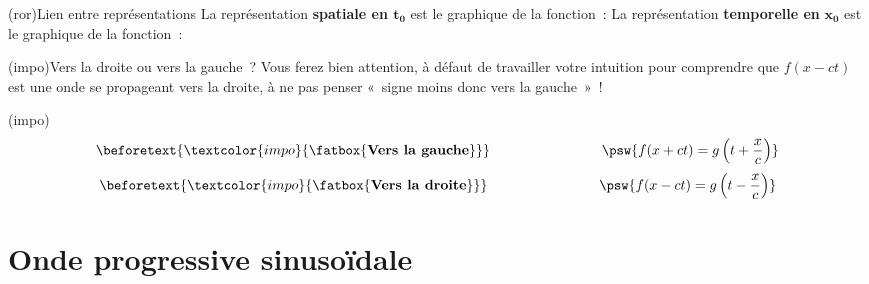 \documentclass[../../main/main.tex]{subfiles}
\begin{document}

\begin{tcb}[sidebyside](ror){Lien entre représentations}
	La représentation \textbf{spatiale en $\mathbf{t_0}$} est le graphique de la
	fonction~:
	\psw{%
		\[y~:~x \mapsto y(x,t_0) = f(x-ct_0) = g\left(t_0 - \frac{x}{c}\right)\]
	}%
	\vspace{-15pt}
	\tcblower
	La représentation \textbf{temporelle en} $\mathbf{x_0}$ est le graphique de la
	fonction~:
	\psw{%
		\[y~:~t \mapsto y(x_0,t) = f(x_0-ct) = g\left(t - \frac{x_0}{c}\right)\]
	}%
	\vspace{-15pt}
\end{tcb}

\begin{tcb*}(impo){Vers la droite ou vers la gauche~?}
	Vous ferez bien attention, à défaut de travailler votre intuition pour
	comprendre que $f (x-ct)$ est une onde se propageant vers la droite, à ne pas
	penser «~signe moins donc vers la gauche~»~!
	\smallbreak
	\begin{isd}(impo)
		\vspace{-15pt}
		\begin{gather*}
			\beforetext{\textcolor{impo}{\fatbox{\textbf{Vers la gauche}}}}
			\hspace{80pt}
			\psw{%
				f (x+ct) = g \left( t + \frac{x}{c} \right)
			}
		\end{gather*}
		\vspace{-25pt}
		\tcblower
		\vspace{-15pt}
		\begin{gather*}
			\beforetext{\textcolor{impo}{\fatbox{\textbf{Vers la droite}}}}
			\hspace{80pt}
			\psw{%
				f (x-ct) = g \left( t - \frac{x}{c} \right)
			}
		\end{gather*}
		\vspace{-25pt}
	\end{isd}
\end{tcb*}

\section{Onde progressive sinusoïdale}
\end{document}
